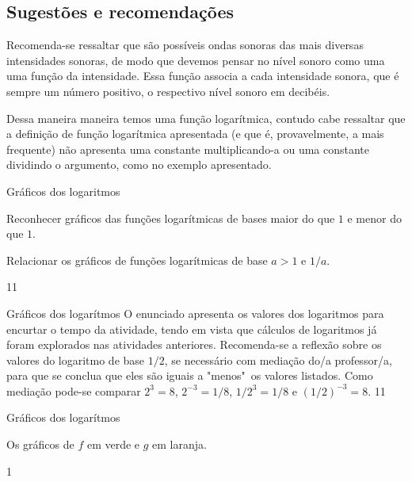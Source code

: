 \marginpar{\vspace{2em}}
\def\currentcolor{session4}
\begin{texto}
{
	\subsection{Sugestões e recomendações}
	Recomenda-se ressaltar que são possíveis ondas sonoras das mais diversas intensidades sonoras, de modo que devemos pensar no nível sonoro como uma uma função da intensidade. Essa função associa a cada intensidade sonora, que é sempre um número positivo, o respectivo nível sonoro em decibéis.

	Dessa maneira maneira temos uma função logarítmica, contudo cabe ressaltar que a definição de função logarítmica apresentada (e que é, provavelmente, a mais frequente) não apresenta uma constante multiplicando-a ou uma constante dividindo o argumento, como no exemplo apresentado.
}
\end{texto}
\clearmargin
\begin{objectives}{Gráficos dos logaritmos}
{
	Reconhecer gráficos das funções logarítmicas de bases maior do que $1$ e menor do que $1$.

Relacionar os gráficos de funções logarítmicas de base $a>1$ e $1/a$.
}{1}{1}
\end{objectives}
\begin{sugestions}{Gráficos dos logarítmos}
{
	O enunciado apresenta os valores dos logaritmos para encurtar o tempo da atividade, tendo em vista que cálculos de logaritmos já foram explorados nas atividades anteriores. Recomenda-se a reflexão sobre os valores do logaritmo de base $1/2$, se necessário com mediação do/a  professor/a, para que se conclua que eles são iguais a "menos"\, os valores listados. Como mediação pode-se comparar $2^3=8$, $2^{-3}=1/8$, $1/2^3=1/8$ e $(1/2)^{-3}=8$.
}{1}{1}
\end{sugestions}

\begin{answer}{Gráficos dos logarítmos}
{
	Os gráficos de $f$ em verde e $g$ em laranja.

	\centering

}{1}
\end{answer}


